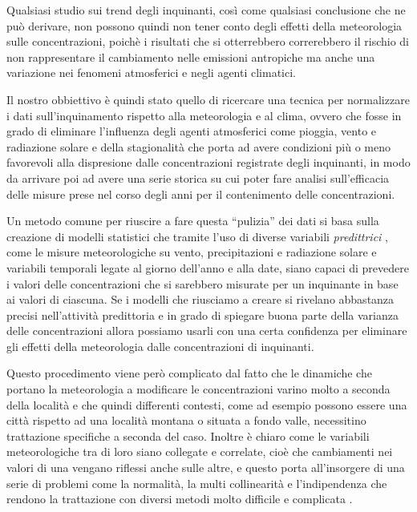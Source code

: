 \documentclass[a4paper,12pt]{report}
\begin{document}
Qualsiasi studio sui trend degli inquinanti, così come qualsiasi conclusione che ne può derivare, non possono quindi non tener conto degli effetti della meteorologia sulle concentrazioni, poichè i risultati che si otterrebbero correrebbero il rischio di non rappresentare il cambiamento nelle emissioni antropiche ma anche una variazione nei fenomeni atmosferici e negli agenti climatici.  

Il nostro obbiettivo è quindi stato quello di ricercare una tecnica per normalizzare i dati sull'inquinamento rispetto alla meteorologia e al clima, ovvero che fosse in grado di eliminare l'influenza degli agenti atmosferici come pioggia, vento e radiazione solare e della stagionalità che porta ad avere condizioni più o meno favorevoli alla dispresione dalle concentrazioni registrate degli inquinanti, in modo da arrivare poi ad avere una serie storica su cui poter fare analisi sull'efficacia delle misure prese nel corso degli anni per il contenimento delle concentrazioni.  

Un metodo comune per riuscire a fare questa ``pulizia''%
dei dati si basa sulla creazione di modelli statistici che tramite l'uso di diverse variabili \textit{predittrici}
, come le misure meteorologiche su vento, precipitazioni e radiazione solare e variabili temporali legate al giorno dell'anno e alla date, siano capaci di prevedere i valori delle concentrazioni che si sarebbero misurate per un inquinante in base ai valori di ciascuna. Se i modelli che riusciamo a creare si rivelano abbastanza precisi nell'attività predittoria e in grado di spiegare buona parte della varianza delle concentrazioni allora possiamo usarli con una certa confidenza per eliminare gli effetti della meteorologia dalle concentrazioni di inquinanti.  

Questo procedimento viene però complicato dal fatto che le dinamiche che portano la meteorologia a modificare le concentrazioni varino molto a seconda della località e che quindi differenti contesti, come ad esempio possono essere una città rispetto ad una località montana o situata a fondo valle, necessitino trattazione specifiche a seconda del caso. Inoltre è chiaro come le variabili meteorologiche tra di loro siano collegate e correlate, cioè che cambiamenti nei valori di una vengano riflessi anche sulle altre, e questo porta all'insorgere di una serie di problemi come la normalità, la multi collinearità e l'indipendenza che rendono la trattazione con diversi metodi molto difficile e complicata \cite{gunst1975regression}. 
\end{document}
